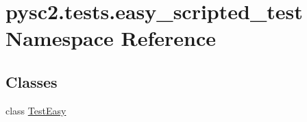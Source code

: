 \hypertarget{namespacepysc2_1_1tests_1_1easy__scripted__test}{}\section{pysc2.\+tests.\+easy\+\_\+scripted\+\_\+test Namespace Reference}
\label{namespacepysc2_1_1tests_1_1easy__scripted__test}
\subsection*{Classes}
\begin{DoxyCompactItemize}
\item 
class \mbox{\hyperlink{classpysc2_1_1tests_1_1easy__scripted__test_1_1_test_easy}{Test\+Easy}}
\end{DoxyCompactItemize}
